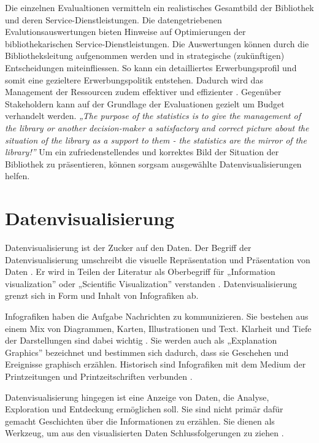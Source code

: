 Die einzelnen Evalualtionen vermitteln ein realistisches Gesamtbild der Bibliothek und deren Service-Dienstleistungen. 
Die datengetriebenen Evalutionsauswertungen bieten Hinweise auf Optimierungen der bibliothekarischen Service-Dienstleistungen. 
Die Auswertungen können durch die Bibliotheksleitung aufgenommen werden und in strategische (zukünftigen) Entscheidungen miteinfliessen. 
So kann ein detailliertes Erwerbungsprofil und somit eine gezieltere Erwerbungspolitik entstehen. 
Dadurch wird das Management der Ressourcen zudem effektiver und effizienter \cite[Vgl.][297]{johnson_peggy_fundamentals_2014}.
Gegenüber Stakeholdern kann auf der Grundlage der Evaluationen gezielt um Budget verhandelt werden.
\textit{„The purpose of the statistics is to give the management of the library or another decision-maker 
a satisfactory and correct picture about the situation of the library as a support to them - the statistics are the mirror of the library!”}
\cite[463]{laitinen_markku_library_2013}
Um ein zufriedenstellendes und korrektes Bild der Situation der Bibliothek zu präsentieren, können sorgsam ausgewählte Datenvisualisierungen helfen.

\section{Datenvisualisierung}
Datenvisualisierung ist der Zucker auf den Daten.
Der Begriff der Datenvisualisierung umschreibt die visuelle Repräsentation und Präsentation von Daten \cite[Vgl.][15]{kirk_data_2019}.
Er wird in Teilen der Literatur als Oberbegriff für „Information visualization” oder „Scientific Visualization” verstanden \cite[Vgl.][11]{few_now_2009}.
Datenvisualisierung grenzt sich in Form und Inhalt von Infografiken ab. 

Infografiken haben die Aufgabe Nachrichten zu kommunizieren.
Sie bestehen aus einem Mix von Diagrammen, Karten, Illustrationen und Text. Klarheit und Tiefe der Darstellungen sind dabei wichtig
\cite[Vgl.][31]{cairo_truthful_2016}. Sie werden auch als „Explanation Graphics”
bezeichnet und bestimmen sich dadurch, dass sie Geschehen und Ereignisse graphisch erzählen. 
Historisch sind Infografiken mit dem Medium der Printzeitungen und Printzeitschriften verbunden \cite[Vgl.][27]{kirk_data_2019}.

Datenvisualisierung hingegen ist eine Anzeige von Daten, die Analyse, Exploration und Entdeckung ermöglichen soll.
Sie sind nicht primär dafür gemacht Geschichten über die Informationen zu erzählen. Sie dienen als Werkzeug, um aus den visualisierten Daten Schlussfolgerungen zu ziehen 
\cite[Vgl.][31]{cairo_truthful_2016}.


